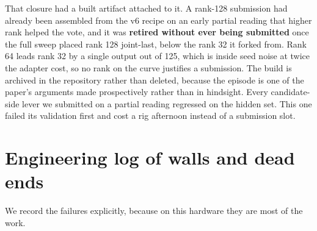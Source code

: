 \documentclass[11pt]{article}
\begin{document}
That closure had a built artifact attached to it. A rank-128 submission had already been assembled from the
v6 recipe on an early partial reading that higher rank helped the vote, and it was \textbf{retired without
ever being submitted} once the full sweep placed rank 128 joint-last, below the rank 32 it forked from. Rank 64
leads rank 32 by a single output out of 125, which is inside seed noise at twice the adapter cost, so no
rank on the curve justifies a submission. The build is archived in the repository rather than deleted,
because the episode is one of the paper's arguments made prospectively rather than in hindsight. Every
candidate-side lever we submitted on a partial reading regressed on the hidden set. This one failed its
validation first and cost a rig afternoon instead of a submission slot.

\section{Engineering log of walls and dead ends}
\label{app:log}
We record the failures explicitly, because on this hardware they are most of the work.
\end{document}
